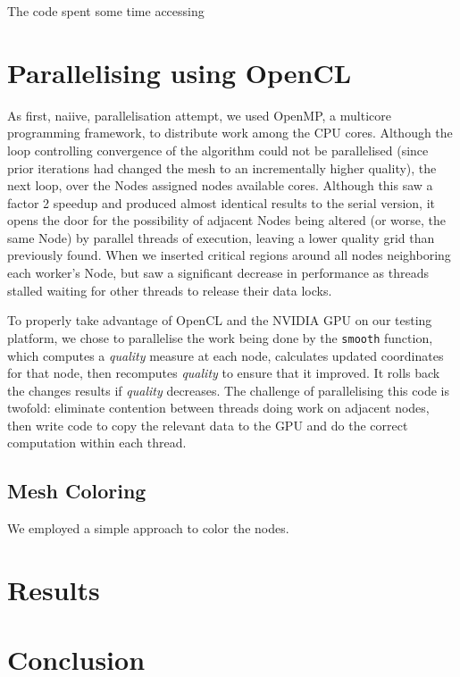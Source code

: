 \documentclass[a4paper,11pt, twocolumn]{article}
\begin{document}
The code spent some time accessing 

\section{Parallelising using OpenCL}
As first, naiive, parallelisation attempt, we used OpenMP, a multicore programming framework, to distribute work among the CPU cores.  Although the loop controlling convergence of the algorithm could not be parallelised (since prior iterations had changed the mesh to an incrementally higher quality), the next loop, over the Nodes assigned nodes available cores.  Although this saw a factor 2 speedup and produced almost identical results to the serial version, it opens the door for the possibility of adjacent Nodes being altered (or worse, the same Node) by parallel threads of execution, leaving a lower quality grid than previously found.  When we inserted critical regions around all nodes neighboring each worker's Node, but saw a significant decrease in performance as threads stalled waiting for other threads to release their data locks.

To properly take advantage of OpenCL and the NVIDIA GPU on our testing platform, we chose to parallelise the work being done by the \verb+smooth+ function, which computes a \emph{quality} measure at each node, calculates updated coordinates for that node, then recomputes \emph{quality} to ensure that it improved.  It rolls back the changes results if \emph{quality} decreases.  The challenge of parallelising this code is twofold: eliminate contention between threads doing work on adjacent nodes, then write code to copy the relevant data to the GPU and do the correct computation within each thread.

\subsection{Mesh Coloring}
We employed a simple approach to color the nodes.
\section{Results}
\section{Conclusion}


\end{document}
